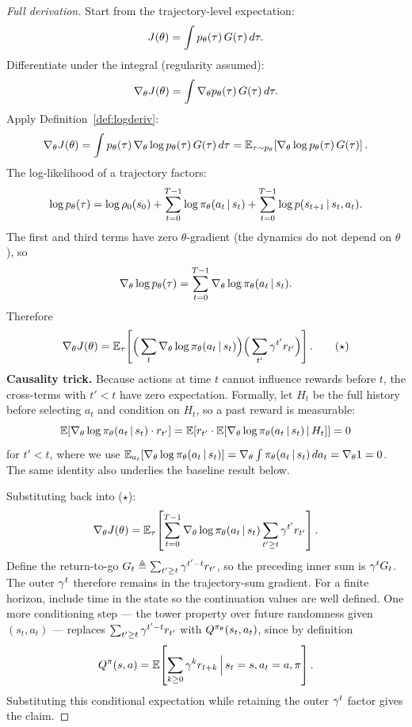 \documentclass[11pt,oneside]{scrbook}
\begin{document}
\begin{proof}[Full derivation]
Start from the trajectory-level expectation:
\[
  J(\theta) = \int p_\theta(\tau)\, G(\tau)\, d\tau.
\]
Differentiate under the integral (regularity assumed):
\[
  \nabla_\theta J(\theta) = \int \nabla_\theta p_\theta(\tau)\, G(\tau)\, d\tau.
\]
Apply Definition~\ref{def:logderiv}:
\[
  \nabla_\theta J(\theta) = \int p_\theta(\tau)\, \nabla_\theta \log p_\theta(\tau)\, G(\tau)\, d\tau
  = \mathbb{E}_{\tau \sim p_\theta}\!\left[\nabla_\theta \log p_\theta(\tau)\, G(\tau)\right].
\]
The log-likelihood of a trajectory factors:
\[
  \log p_\theta(\tau) = \log \rho_0(s_0) + \sum_{t=0}^{T-1} \log \pi_\theta(a_t\,\vert\, s_t) + \sum_{t=0}^{T-1} \log p(s_{t+1}\,\vert\, s_t,a_t).
\]
The first and third terms have zero $\theta$-gradient (the dynamics do not depend on $\theta$), so
\[
  \nabla_\theta \log p_\theta(\tau) = \sum_{t=0}^{T-1} \nabla_\theta \log \pi_\theta(a_t \,\vert\, s_t).
\]
Therefore
\[
  \nabla_\theta J(\theta) = \mathbb{E}_{\tau}\!\left[\Big(\sum_{t} \nabla_\theta \log \pi_\theta(a_t\,\vert\, s_t)\Big)\Big(\sum_{t'} \gamma^{t'} r_{t'}\Big)\right]. \tag{$\star$}
\]
\textbf{Causality trick.} Because actions at time $t$ cannot influence rewards before $t$, the cross-terms with $t'<t$ have zero expectation. Formally, let $H_t$ be the full history before selecting $a_t$ and
condition on $H_t$, so a past reward is measurable:
\[
  \mathbb{E}\!\left[\nabla_\theta \log \pi_\theta(a_t\,\vert\, s_t) \cdot r_{t'}\right]
  = \mathbb{E}\!\left[ r_{t'} \cdot \mathbb{E}[\nabla_\theta \log \pi_\theta(a_t\,\vert\, s_t) \,\vert\, H_t]\right] = 0
\]
for $t' < t$, where we use $\mathbb{E}_{a_t}[\nabla_\theta \log \pi_\theta(a_t\,\vert\, s_t)] = \nabla_\theta \int \pi_\theta(a_t\,\vert\, s_t)\, da_t = \nabla_\theta 1 = 0$. The same identity also underlies the baseline result below.

Substituting back into ($\star$):
\[
  \nabla_\theta J(\theta) = \mathbb{E}_\tau\!\left[\sum_{t=0}^{T-1} \nabla_\theta \log \pi_\theta(a_t\,\vert\, s_t) \sum_{t' \ge t} \gamma^{t'} r_{t'}\right].
\]
Define the return-to-go $G_t \triangleq \sum_{t' \ge t} \gamma^{t'-t} r_{t'}$,
so the preceding inner sum is $\gamma^tG_t$. The outer $\gamma^t$
therefore remains in the trajectory-sum gradient. For a finite horizon,
include time in the state so the continuation values are well defined. One more conditioning step --- the tower property over future randomness given $(s_t, a_t)$ --- replaces $\sum_{t'\ge t}\gamma^{t'-t} r_{t'}$ with $Q^{\pi_\theta}(s_t, a_t)$, since by definition
\[
  Q^{\pi}(s,a) = \mathbb{E}\!\left[\sum_{k \ge 0} \gamma^{k} r_{t+k} \,\Big|\, s_t=s, a_t=a, \pi\right].
\]
Substituting this conditional expectation while retaining the outer $\gamma^t$ factor gives the claim.
\end{proof}
\end{document}
